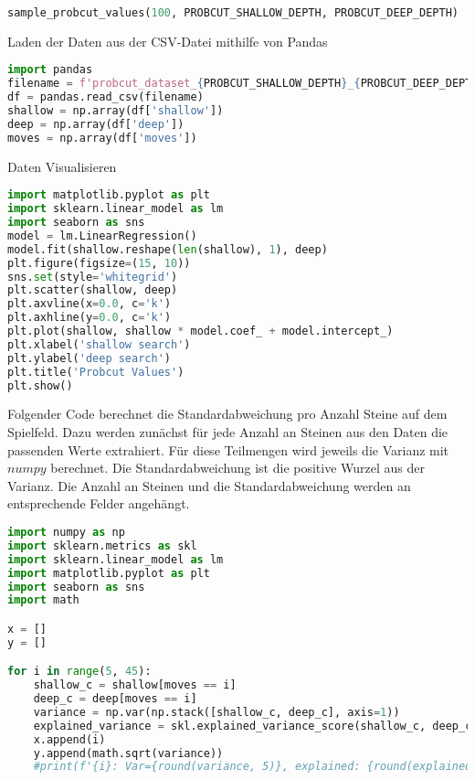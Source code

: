\begin{lstlisting}[language=Python]
sample_probcut_values(100, PROBCUT_SHALLOW_DEPTH, PROBCUT_DEEP_DEPTH)
\end{lstlisting}

Laden der Daten aus der CSV-Datei mithilfe von Pandas

\begin{lstlisting}[language=Python]
import pandas
filename = f'probcut_dataset_{PROBCUT_SHALLOW_DEPTH}_{PROBCUT_DEEP_DEPTH}.csv'
df = pandas.read_csv(filename)
shallow = np.array(df['shallow'])
deep = np.array(df['deep'])
moves = np.array(df['moves'])
\end{lstlisting}

Daten Visualisieren

\begin{lstlisting}[language=Python]
import matplotlib.pyplot as plt
import sklearn.linear_model as lm
import seaborn as sns
model = lm.LinearRegression()
model.fit(shallow.reshape(len(shallow), 1), deep)
plt.figure(figsize=(15, 10))
sns.set(style='whitegrid')
plt.scatter(shallow, deep)
plt.axvline(x=0.0, c='k')
plt.axhline(y=0.0, c='k')
plt.plot(shallow, shallow * model.coef_ + model.intercept_)
plt.xlabel('shallow search')
plt.ylabel('deep search')
plt.title('Probcut Values')
plt.show()
\end{lstlisting}

Folgender Code berechnet die Standardabweichung pro Anzahl Steine auf
dem Spielfeld. Dazu werden zunächst für jede Anzahl an Steinen aus den
Daten die passenden Werte extrahiert. Für diese Teilmengen wird jeweils
die Varianz mit \(numpy\) berechnet. Die Standardabweichung ist die
positive Wurzel aus der Varianz. Die Anzahl an Steinen und die
Standardabweichung werden an entsprechende Felder angehängt.

\begin{lstlisting}[language=Python]
import numpy as np
import sklearn.metrics as skl
import sklearn.linear_model as lm
import matplotlib.pyplot as plt
import seaborn as sns
import math

x = []
y = []

for i in range(5, 45):
    shallow_c = shallow[moves == i]
    deep_c = deep[moves == i]
    variance = np.var(np.stack([shallow_c, deep_c], axis=1))
    explained_variance = skl.explained_variance_score(shallow_c, deep_c)
    x.append(i)
    y.append(math.sqrt(variance))
    #print(f'{i}: Var={round(variance, 5)}, explained: {round(explained_variance, 3)}')
\end{lstlisting}

